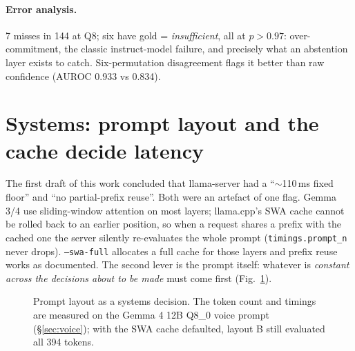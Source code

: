 \documentclass[11pt,a4paper]{article}
\newcommand{\code}[1]{\texttt{#1}}
\begin{document}
\paragraph{Error analysis.} 7 misses in 144 at Q8; six have gold = \emph{insufficient}, all at $p>0.97$: over-commitment, the classic instruct-model failure, and precisely what an abstention layer exists to catch. Six-permutation disagreement flags it better than raw confidence (AUROC 0.933 vs 0.834).

\section{Systems: prompt layout and the cache decide latency}
\label{sec:systems}

The first draft of this work concluded that llama-server had a ``$\sim$110\,ms fixed floor'' and ``no partial-prefix reuse''. Both were an artefact of one flag. Gemma 3/4 use sliding-window attention on most layers; llama.cpp's SWA cache cannot be rolled back to an earlier position, so when a request shares a prefix with the cached one the server silently re-evaluates the whole prompt (\code{timings.prompt\_n} never drops). \code{--swa-full} allocates a full cache for those layers and prefix reuse works as documented. The second lever is the prompt itself: whatever is \emph{constant across the decisions about to be made} must come first (Fig.~\ref{fig:layout}).

\begin{figure}[H]
\centering
{}
\caption{Prompt layout as a systems decision. The token count and timings are measured on the Gemma 4 12B Q8\_0 voice prompt (\S\ref{sec:voice}); with the SWA cache defaulted, layout B still evaluated all 394 tokens.}
\label{fig:layout}
\end{figure}
\end{document}
